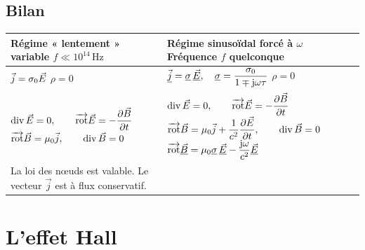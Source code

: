 \documentclass[11pt,a4paper]{article}
\newcommand{\vj}{\vec j}\newcommand{\vE}{\vec E}\newcommand{\vB}{\vec B}
\newcommand{\divg}{\operatorname{div}}\newcommand{\sy}{\operatorname{sym}}
\newcommand{\cx}[1]{\underline{#1}}
\newcommand{\imag}{\mathrm{j}}
\newcommand{\unite}[1]{\,\mathrm{#1}}
\begin{document}
\subsection{Bilan}\label{sec:bilan}
\begingroup
\renewcommand{\arraystretch}{1.10}\setlength{\tabcolsep}{7pt}
\newcommand{\casebilan}[1]{\begin{minipage}[t]{\linewidth}\centering
\vspace{1.5pt}#1\par\vspace{1.5pt}\end{minipage}}
\noindent\begin{tabularx}{\linewidth}{|X|X|}
\hline
\casebilan{\textbf{Régime « lentement » variable}\\[2pt]\(f\ll10^{14}\unite{Hz}\)}
&
\casebilan{\textbf{Régime sinusoïdal forcé à \(\omega\)}\\[2pt]Fréquence \(f\) quelconque}\\ \hline
\casebilan{\(\vj=\sigma_0\E\)\\[4pt]\(\rho=0\)}
&
\casebilan{\(\displaystyle\cx{\vj}=\cx{\sigma}\,\cx{\E},\quad
 \cx{\sigma}=\frac{\sigma_0}{1\mp\imag\omega\tau}\)\\[4pt]\(\rho=0\)}\\ \hline
\casebilan{\(\displaystyle\divg\E=0,\qquad \rot\E=-\frac{\partial\vB}{\partial t}\)\\[6pt]
 \(\displaystyle\rot\vB=\mu_0\vj,\qquad\divg\vB=0\)}
&
\casebilan{\(\displaystyle\divg\E=0,\qquad\rot\E=-\frac{\partial\vB}{\partial t}\)\\[6pt]
 \(\displaystyle\rot\vB=\mu_0\vj+\frac1{c^2}\frac{\partial\E}{\partial t},\qquad\divg\vB=0\)\\[5pt]
 \(\displaystyle\rot\cx{\vB}
 =\mu_0\cx{\sigma}\,\cx{\E}-\frac{\imag\omega}{c^2}\cx{\E}\)}\\ \hline
\casebilan{La loi des nœuds est valable.\\
 Le vecteur \(\vj\) est à flux conservatif.}
&\\ \hline
\end{tabularx}\par
\endgroup

\section{L'effet Hall}\label{sec:hall}
\end{document}
